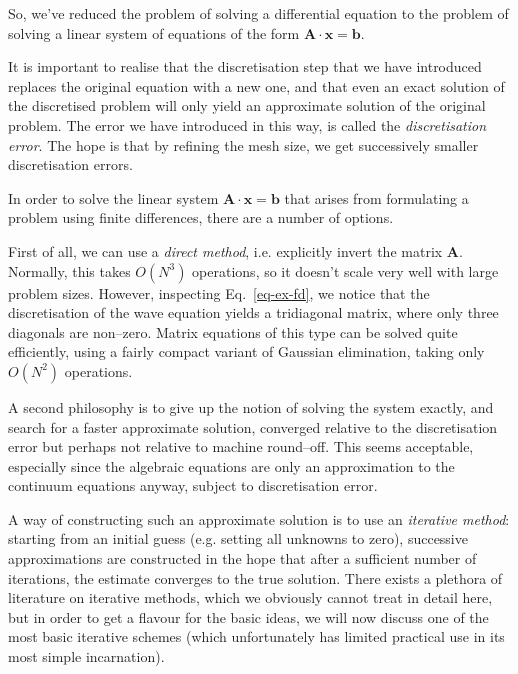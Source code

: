 So, we've reduced the problem of solving a differential equation to the problem of solving a linear system of equations of the form ${\mathbf A}\cdot{\mathbf x}={\mathbf b}$.

It is important to realise that the discretisation step that we have introduced replaces the original equation with a new one, and that even an exact solution of the discretised problem will only yield an approximate solution of the original problem. The error we have introduced in this way, is called the \emph{discretisation error}. The hope is that by refining the mesh size, we get successively smaller discretisation errors. 


\pagebreak




In order to solve the linear system ${\mathbf A}\cdot{\mathbf x}={\mathbf b}$ that arises from formulating a problem using finite differences, there are a number of options.

First of all, we can use a \emph{direct method}, i.e. explicitly invert the matrix ${\mathbf A}$. Normally, this takes $O(N^3)$ operations, so it doesn't scale very well with large problem sizes. However, inspecting Eq.~\ref{eq-ex-fd}, we notice that the discretisation of the wave equation yields a tridiagonal matrix, where only three diagonals are non--zero. Matrix equations of this type can be solved quite efficiently, using a fairly compact variant of Gaussian elimination, taking only $O(N^2)$ operations.

A second philosophy is to give up the notion of solving the system exactly, and search for a faster approximate solution, converged relative to the discretisation error but perhaps not relative to machine round--off. This seems acceptable, especially since the algebraic equations are only an approximation to the continuum equations anyway, subject to discretisation error.

A way of constructing such an approximate solution is to use an \emph{iterative method}: starting from an initial guess (e.g. setting all unknowns to zero), successive approximations  are constructed in the hope that after a sufficient number of iterations, the estimate converges to the true solution. There exists a plethora of literature on iterative methods, which we obviously cannot treat in detail here, but in order to get a flavour for the basic ideas, we will now discuss one of the most basic iterative schemes (which unfortunately has limited practical use in its most simple incarnation).


